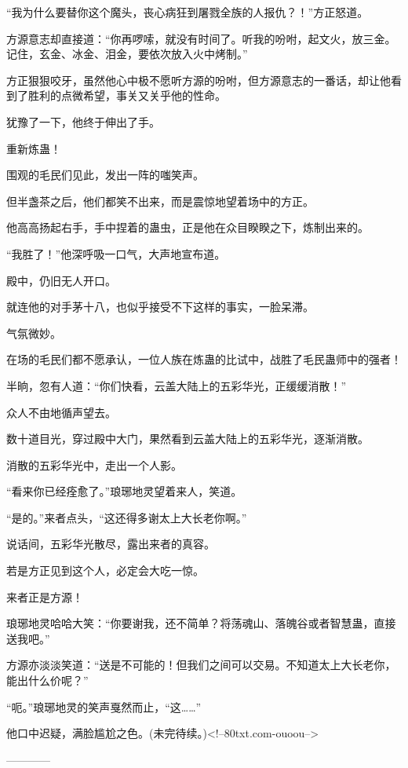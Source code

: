 \begin{this_body}
“我为什么要替你这个魔头，丧心病狂到屠戮全族的人报仇？！”方正怒道。

方源意志却直接道：“你再啰嗦，就没有时间了。听我的吩咐，起文火，放三金。记住，玄金、冰金、泪金，要依次放入火中烤制。”

方正狠狠咬牙，虽然他心中极不愿听方源的吩咐，但方源意志的一番话，却让他看到了胜利的点微希望，事关又关乎他的性命。

犹豫了一下，他终于伸出了手。

重新炼蛊！

围观的毛民们见此，发出一阵的嗤笑声。

但半盏茶之后，他们都笑不出来，而是震惊地望着场中的方正。

他高高扬起右手，手中捏着的蛊虫，正是他在众目睽睽之下，炼制出来的。

“我胜了！”他深呼吸一口气，大声地宣布道。

殿中，仍旧无人开口。

就连他的对手茅十八，也似乎接受不下这样的事实，一脸呆滞。

气氛微妙。

在场的毛民们都不愿承认，一位人族在炼蛊的比试中，战胜了毛民蛊师中的强者！

半晌，忽有人道：“你们快看，云盖大陆上的五彩华光，正缓缓消散！”

众人不由地循声望去。

数十道目光，穿过殿中大门，果然看到云盖大陆上的五彩华光，逐渐消散。

消散的五彩华光中，走出一个人影。

“看来你已经痊愈了。”琅琊地灵望着来人，笑道。

“是的。”来者点头，“这还得多谢太上大长老你啊。”

说话间，五彩华光散尽，露出来者的真容。

若是方正见到这个人，必定会大吃一惊。

来者正是方源！

琅琊地灵哈哈大笑：“你要谢我，还不简单？将荡魂山、落魄谷或者智慧蛊，直接送我吧。”

方源亦淡淡笑道：“送是不可能的！但我们之间可以交易。不知道太上大长老你，能出什么价呢？”

“呃。”琅琊地灵的笑声戛然而止，“这……”

他口中迟疑，满脸尴尬之色。(未完待续。)<!--80txt.com-ouoou-->

------------

\end{this_body}


